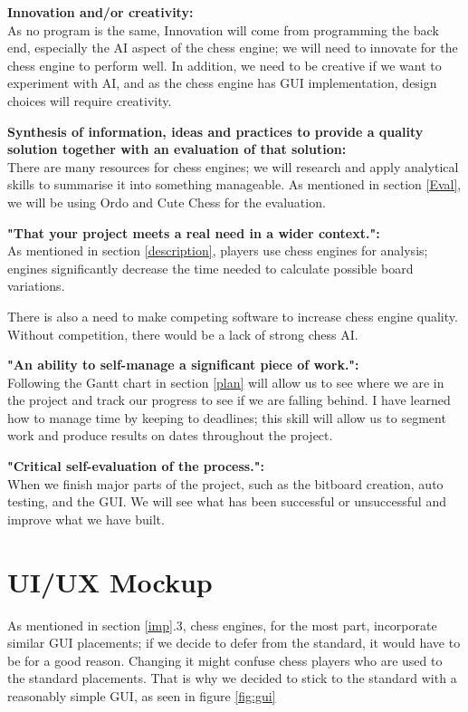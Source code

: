 \documentclass{article}
\begin{document}
\noindent\textbf{Innovation and/or creativity:}\\
As no program is the same, Innovation will come from programming the back end, especially the AI aspect of the chess engine; we will need to innovate for the chess engine to perform well. In addition, we need to be creative if we want to experiment with AI, and as the chess engine has GUI implementation, design choices will require creativity.

\noindent\textbf{Synthesis of information, ideas and practices to provide a quality solution together with an evaluation of that solution:}\\
There are many resources for chess engines; we will research and apply analytical skills to summarise it into something manageable. As mentioned in section \ref{Eval}, we will be using Ordo\cite{ordo} and Cute Chess\cite{cutechess} for the evaluation.

\noindent\textbf{"That your project meets a real need in a wider context.":}\\
As mentioned in section \ref{description}, players use chess engines for analysis; engines significantly decrease the time needed to calculate possible board variations.

There is also a need to make competing software to increase chess engine quality. Without competition, there would be a lack of strong chess AI.

\noindent\textbf{"An ability to self-manage a significant piece of work.":}\\
Following the Gantt chart in section \ref{plan} will allow us to see where we are in the project and track our progress to see if we are falling behind. I have learned how to manage time by keeping to deadlines; this skill will allow us to segment work and produce results on dates throughout the project.

\noindent\textbf{"Critical self-evaluation of the process.":}\\
When we finish major parts of the project, such as the bitboard creation, auto testing, and the GUI. We will see what has been successful or unsuccessful and improve what we have built.

\section{UI/UX Mockup} %
As mentioned in section \ref{imp}.3, chess engines, for the most part, incorporate similar GUI placements; if we decide to defer from the standard, it would have to be for a good reason. Changing it might confuse chess players who are used to the standard placements. That is why we decided to stick to the standard with a reasonably simple GUI, as seen in figure \ref{fig:gui}
\end{document}
